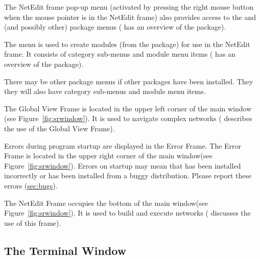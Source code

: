 \begin{description}
\begin{description}
    The NetEdit frame pop-up menu (activated by pressing the right
    mouse button when the mouse pointer is in the NetEdit frame) also
    provides access to the \menu{\sr{}} and \menu{\biopse{}} (and
    possibly other) package menus ( has an overview of the
    \sr{} package).
  \end{description}

  \begin{description}
     The  menu is used to create modules
    (from the \biopse package) for use in the NetEdit frame.  It
    consists of category sub-menus and module menu items 
    (  has an overview of the \biopse{}package).
  \end{description}

  \begin{description}
      There may be other package menus if other packages
    have been installed.  They they will also have category sub-menus
    and module menu items.
  \end{description}
  
   The Global View Frame is located in the
  upper left corner of the main window (see
  Figure~\ref{fig:srwindow}). It is used to navigate complex networks
  (  describes the use of the Global View Frame).
  
   Errors during program startup are displayed
  in the Error Frame.  The Error Frame is located in the upper right corner of the
  main window(see Figure~\ref{fig:srwindow}).  Errors on startup may
  mean that \sr{} has been installed incorrectly or has been installed
  from a buggy distribution.  Please report these errors (\hyperref{report}{(see
    Section~}{)}{sec:bugs}).
  
   The NetEdit Frame occupies the bottom of
  the main window(see Figure~\ref{fig:srwindow}).  It is used to build
  and execute networks ( 
  discusses the use of this frame).

\end{description}

\subsection{The Terminal Window}
\label{sec:termwinapp}

